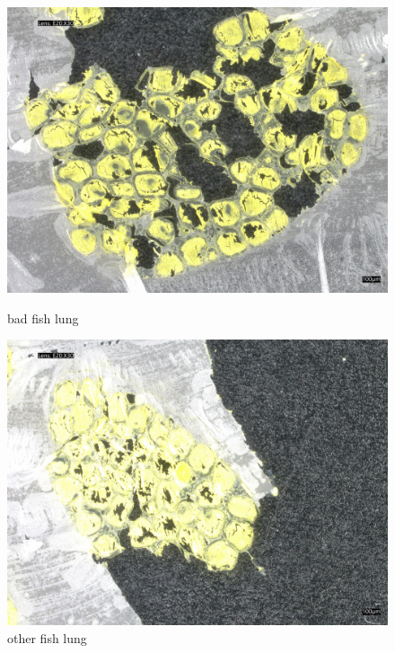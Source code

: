 \begin{figure}[H]
    \centering
    \begin{minipage}{0.45\textwidth}
        \centering
        \includegraphics[width=\textwidth]{./fig/fish_lung/bad20240313_140952.jpg}
        \caption{bad fish lung}
        \label{fig:bad_fish_lung}
    \end{minipage}
    \begin{minipage}{0.45\textwidth}
        \centering
        \includegraphics[width=\textwidth]{./fig/fish_lung/other20240313_141858.jpg}
        \caption{other fish lung}
        \label{fig:other_fish_lung}
\end{minipage}
\end{figure}


